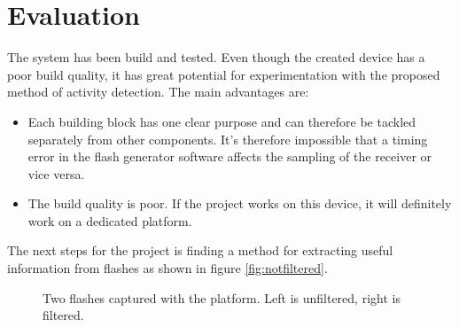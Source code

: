 \section{Evaluation}
The system has been build and tested. Even though the created device has a poor build quality, it has great potential for experimentation with the proposed method of activity detection. The main advantages are:
\begin{itemize}[itemsep=-1ex]
	\item Each building block has one clear purpose and can therefore be tackled separately from other components. It's therefore impossible that a timing error in the flash generator software affects the sampling of the receiver or vice versa.
	\item The build quality is poor. If the project works on this device, it will definitely work on a dedicated platform.
\end{itemize}
The next steps for the project is finding a method for extracting useful information from flashes as shown in figure \ref{fig:notfiltered}. 

\begin{figure}
	\centering     %
	\caption{Two flashes captured with the platform. Left is unfiltered, right is filtered.	\label{fig:FristFlashes}}
\end{figure}